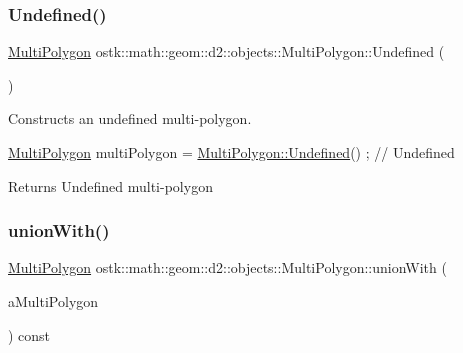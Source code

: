 \subsubsection{\texorpdfstring{Undefined()}{Undefined()}}
{\footnotesize\ttfamily \hyperlink{classostk_1_1math_1_1geom_1_1d2_1_1objects_1_1_multi_polygon}{Multi\+Polygon} ostk\+::math\+::geom\+::d2\+::objects\+::\+Multi\+Polygon\+::\+Undefined (\begin{DoxyParamCaption}{ }\end{DoxyParamCaption})\hspace{0.3cm}{\ttfamily [static]}}



Constructs an undefined multi-\/polygon. 


\begin{DoxyCode}
\hyperlink{classostk_1_1math_1_1geom_1_1d2_1_1objects_1_1_multi_polygon_ad65532c9b323b5358cdcdd43da5ef9bd}{MultiPolygon} multiPolygon = \hyperlink{classostk_1_1math_1_1geom_1_1d2_1_1objects_1_1_multi_polygon_aa80a7642515417486bb846f869120fcd}{MultiPolygon::Undefined}() ; \textcolor{comment}{// Undefined}
\end{DoxyCode}


\begin{DoxyReturn}{Returns}
Undefined multi-\/polygon 
\end{DoxyReturn}
\mbox{\label{classostk_1_1math_1_1geom_1_1d2_1_1objects_1_1_multi_polygon_a0762c6a4b4aaa70082394df690f3c96c}} 
\subsubsection{\texorpdfstring{union\+With()}{unionWith()}}
{\footnotesize\ttfamily \hyperlink{classostk_1_1math_1_1geom_1_1d2_1_1objects_1_1_multi_polygon}{Multi\+Polygon} ostk\+::math\+::geom\+::d2\+::objects\+::\+Multi\+Polygon\+::union\+With (\begin{DoxyParamCaption}\item[{const \hyperlink{classostk_1_1math_1_1geom_1_1d2_1_1objects_1_1_multi_polygon}{Multi\+Polygon} \&}]{a\+Multi\+Polygon }\end{DoxyParamCaption}) const}




